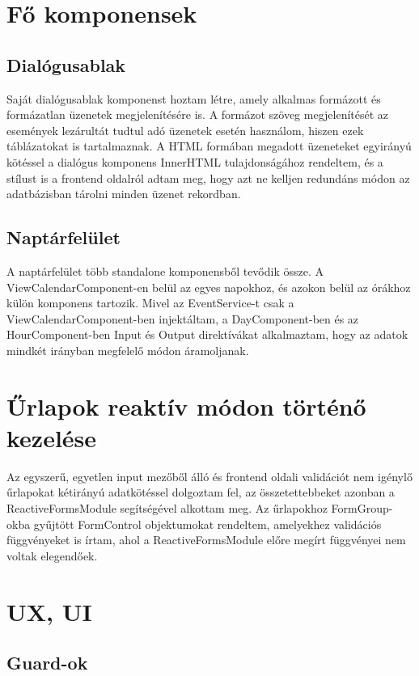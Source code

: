 \documentclass[a4paper,12pt]{report}
\theoremstyle{definition}
\theoremstyle{remark}
\begin{document}
\section{Fő komponensek}

	\subsection{Dialógusablak}

Saját dialógusablak komponenst hoztam létre, amely alkalmas formázott és formázatlan üzenetek megjelenítésére is. A formázot szöveg megjelenítését az események lezárultát tudtul adó üzenetek esetén használom, hiszen ezek táblázatokat is tartalmaznak.  A HTML formában megadott üzeneteket egyirányú kötéssel a dialógus komponens InnerHTML tulajdonságához rendeltem, és a stílust is a frontend oldalról adtam meg, hogy azt ne kelljen redundáns módon az adatbázisban tárolni minden üzenet rekordban.

	\subsection{Naptárfelület}

A naptárfelület több standalone komponensből tevődik össze. A ViewCalendarComponent-en belül az egyes napokhoz, és azokon belül az órákhoz külön komponens tartozik. Mivel az EventService-t csak a ViewCalendarComponent-ben injektáltam, a DayComponent-ben és az HourComponent-ben Input és Output direktívákat alkalmaztam, hogy az adatok mindkét irányban megfelelő módon áramoljanak.

\section{Űrlapok reaktív módon történő kezelése}

Az egyszerű, egyetlen input mezőből álló és frontend oldali validációt nem igénylő űrlapokat kétirányú adatkötéssel dolgoztam fel, az összetettebbeket azonban a ReactiveFormsModule segítségével alkottam meg. Az űrlapokhoz FormGroup-okba gyűjtött FormControl objektumokat rendeltem, amelyekhez validációs függvényeket is írtam, ahol a ReactiveFormsModule előre megírt függvényei nem voltak elegendőek.

\section{UX, UI}

	\subsection{Guard-ok}
\end{document}
